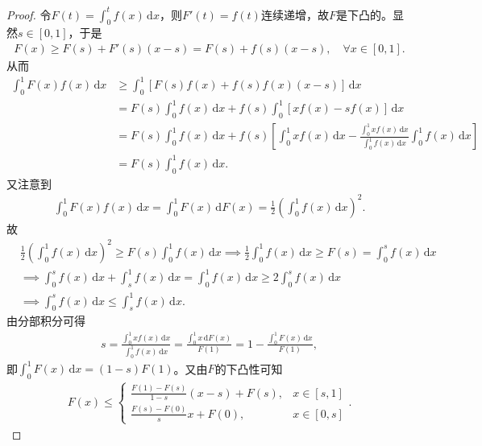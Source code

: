 \documentclass[../../main.tex]{subfiles}
\begin{document}
\begin{proof}
令$F(t) = \int_0^t f(x) \, \mathrm{d}x$，则$F'(t) = f(t)$连续递增，故$F$是下凸的。显然$s \in [0,1]$，于是
\begin{align*}
F(x) \geqslant  F(s) + F'(s)(x - s) = F(s) + f(s)(x - s), \quad \forall x \in [0,1].
\end{align*}
从而
\begin{align*}
\int_0^1 F(x) f(x) \, \mathrm{d}x &\geqslant  \int_0^1 \left[ F(s) f(x) + f(s) f(x)(x - s) \right] \, \mathrm{d}x \\
&= F(s) \int_0^1 f(x) \, \mathrm{d}x + f(s) \int_0^1 \left[ x f(x) - s f(x) \right] \, \mathrm{d}x \\
&= F(s) \int_0^1 f(x) \, \mathrm{d}x + f(s) \left[ \int_0^1 x f(x) \, \mathrm{d}x - \frac{\int_0^1 x f(x) \, \mathrm{d}x}{\int_0^1 f(x) \, \mathrm{d}x} \int_0^1 f(x) \, \mathrm{d}x \right] \\
&= F(s) \int_0^1 f(x) \, \mathrm{d}x.
\end{align*}
又注意到
\begin{align*}
\int_0^1 F(x) f(x) \, \mathrm{d}x = \int_0^1 F(x) \, \mathrm{d}F(x) = \frac{1}{2} \left( \int_0^1 f(x) \, \mathrm{d}x \right)^2.
\end{align*}
故
\begin{align*}
&\frac{1}{2} \left( \int_0^1 f(x) \, \mathrm{d}x \right)^2 \geqslant  F(s) \int_0^1 f(x) \, \mathrm{d}x \implies \frac{1}{2} \int_0^1 f(x) \, \mathrm{d}x \geqslant  F(s) = \int_0^s f(x) \, \mathrm{d}x \\
&\implies \int_0^s f(x) \, \mathrm{d}x + \int_s^1 f(x) \, \mathrm{d}x = \int_0^1 f(x) \, \mathrm{d}x \geqslant  2 \int_0^s f(x) \, \mathrm{d}x \\
&\implies \int_0^s f(x) \, \mathrm{d}x \leqslant  \int_s^1 f(x) \, \mathrm{d}x.
\end{align*}
由分部积分可得
\begin{align*}
s = \frac{\int_0^1 x f(x) \, \mathrm{d}x}{\int_0^1 f(x) \, \mathrm{d}x} = \frac{\int_0^1 x \, \mathrm{d}F(x)}{F(1)} = 1 - \frac{\int_0^1 F(x) \, \mathrm{d}x}{F(1)},
\end{align*}
即$\int_0^1 F(x) \, \mathrm{d}x = (1 - s) F(1)$。又由$F$的下凸性可知
\begin{align*}
F(x) \leqslant  
\begin{cases}
\frac{F(1) - F(s)}{1 - s}(x - s) + F(s), & x \in [s,1] \\
\frac{F(s) - F(0)}{s}x + F(0), & x \in [0,s]
\end{cases}.
\end{align*}

\end{proof}
\end{document}
